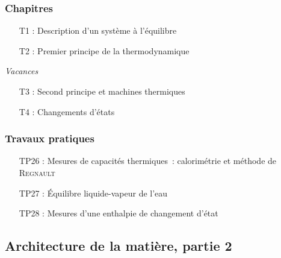 \documentclass[a4paper, 10pt, final, garamond]{book}
\begin{document}
\begin{multicols}{2}
	\subsubsection{Chapitres}

	\begin{itemize}[label=$\diamond$]
		\item[T1]: Description d'un système à l'équilibre
		\item[T2]: Premier principe de la thermodynamique
	\end{itemize}

	\begin{center}
		\textit{\Large Vacances}
	\end{center}

	\begin{itemize}
		\item[T3]: Second principe et machines thermiques
		\item[T4]: Changements d'états
	\end{itemize}

	\columnbreak

	\subsubsection{Travaux pratiques}

	\begin{itemize}[label=$\diamond$]
		\item[TP26]: Mesures de capacités thermiques~: calorimétrie et méthode de
		\textsc{Regnault}
		\item[TP27]: Équilibre liquide-vapeur de l'eau
		\item[TP28]: Mesures d'une enthalpie de changement d'état
	\end{itemize}
\end{multicols}

\newpage

\subsection{Architecture de la matière, partie 2}
\end{document}
